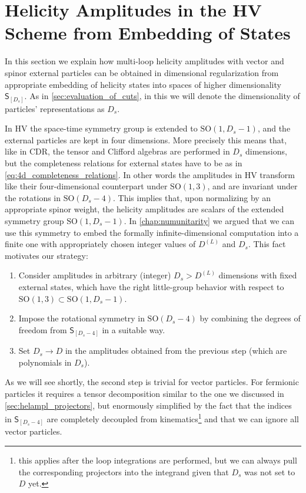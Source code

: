 \section{Helicity Amplitudes in the HV Scheme from Embedding of States}
\label{sec:helampl_embeding}

In this section we explain how multi-loop helicity amplitudes
with vector and spinor external particles can be obtained in dimensional regularization
from appropriate embedding of helicity states into spaces of higher dimensionality $\mathsf{S}_{[D_s]}$.
As in \cref{sec:evaluation_of_cuts}, in this  we will denote the dimensionality of particles'
representations as $D_s$.


In HV the space-time symmetry group is extended to $\mathrm{SO}(1,D_s-1)$, and the external particles are kept in four dimensions. 
More precisely this means that, like in CDR, the tensor and Clifford algebras are performed in $D_s$ dimensions,
but the completeness relations for external states have to be as in \cref{eq:4d_completeness_relations}. 
In other words the amplitudes in HV transform like their four-dimensional counterpart under $\mathrm{SO}(1,3)$, 
and are invariant under the rotations in $\mathrm{SO}(D_s-4)$. 
This implies that, upon normalizing by an appropriate spinor weight, the helicity amplitudes are scalars of the extended symmetry group $\mathrm{SO}(1,D_s-1)$.
In \cref{chap:numunitarity} we argued that we can use this symmetry to embed the formally infinite-dimensional computation
into a finite one with appropriately chosen integer values of $D^{(L)}$ and $D_s$.
This fact motivates our strategy:
\begin{enumerate}
  \item Consider amplitudes in arbitrary (integer) $D_s > D^{(L)}$ dimensions with fixed external states,
    which have the right little-group behavior with respect to $\mathrm{SO}(1,3) \subset \mathrm{SO}(1,D_s-1)$.
  \item Impose the rotational symmetry in $\mathrm{SO}(D_s-4)$ by combining the degrees of freedom from $\mathsf{S}_{[D_s-4]}$ in
    a suitable way.
  \item Set $D_s\to D$ in the amplitudes obtained from the previous step (which are polynomials in $D_s$).
\end{enumerate}
As we will see shortly, the second step is trivial for vector particles. For fermionic
particles it requires a tensor decomposition similar to the one we discussed in \cref{sec:helampl_projectors},
but enormously simplified by the fact that the indices in  $\mathsf{S}_{[D_s-4]}$ are completely decoupled from kinematics\footnote{
  this applies after the loop integrations are performed, 
  but we can always pull the corresponding projectors into the integrand given that $D_s$ was not set to $D$ yet.
}
and that we can ignore all vector particles.



